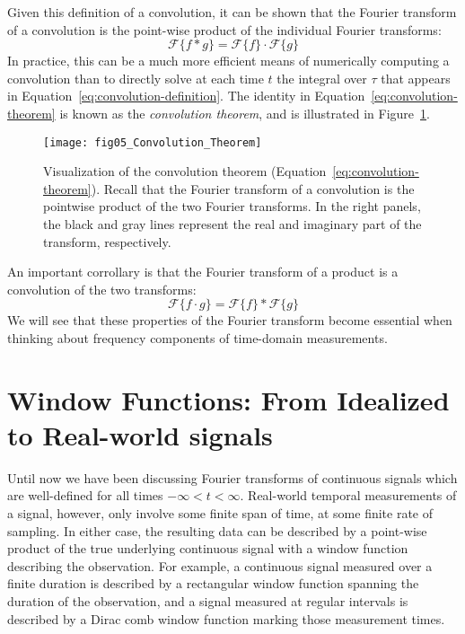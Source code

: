 \documentclass[preprint]{aastex}
\newcommand{\fig}[1]{Figure~\ref{fig:#1}}
\newcommand{\figlabel}[1]{\label{fig:#1}}
\newcommand{\Eq}[1]{Equation~\ref{eq:#1}}
\newcommand{\eq}[1]{\Eq{#1}}
\newcommand{\eqlabel}[1]{\label{eq:#1}}
\newcommand{\sectlabel}[1]{\label{sect:#1}}
\begin{document}
Given this definition of a convolution, it can be shown that the Fourier transform of a convolution is the point-wise product of the individual
Fourier transforms:
\begin{equation}
  \mathcal{F}\{f \ast g\} = \mathcal{F}\{f\} \cdot \mathcal{F}\{g\}
  \eqlabel{convolution-theorem}
\end{equation}
In practice, this can be a much more efficient means of numerically computing a convolution
than to directly solve at each time $t$ the integral over $\tau$ that appears
in \eq{convolution-definition}.
The identity in \eq{convolution-theorem} is known as the
{\it convolution theorem}, and is illustrated in \fig{convolution-theorem}.
\begin{figure}[ht]
  \centering
  \texttt{[image: fig05\_Convolution\_Theorem]}
  \caption{Visualization of the convolution theorem (\eq{convolution-theorem}).
    Recall that the Fourier transform of
    a convolution is the pointwise product of the two Fourier transforms.
    In the right panels, the black and gray lines represent the real and
    imaginary part of the transform, respectively.
    \figlabel{convolution-theorem}}
\end{figure}
An important corrollary is that the Fourier transform of a product is a convolution of the two transforms:
\begin{equation}
  \mathcal{F}\{f \cdot g\} = \mathcal{F}\{f\} \ast \mathcal{F}\{g\}
  \eqlabel{convolution-theorem-inverse}
\end{equation}
We will see that these properties of the Fourier transform become essential
when thinking about frequency components of time-domain measurements.


\section{Window Functions: From Idealized to Real-world signals}
\sectlabel{window-functions}

Until now we have been discussing Fourier transforms of continuous signals
which are well-defined for all times $-\infty < t < \infty$.
Real-world temporal measurements of a signal, however, only involve some
finite span of time, at some finite rate of sampling.
In either case, the resulting data can be described by a point-wise product
of the true underlying continuous signal with a window function describing
the observation.
For example, a continuous signal measured over a finite duration is described
by a rectangular window function spanning the duration of the observation,
and a signal measured at regular intervals is described by a Dirac comb window
function marking those measurement times.
\end{document}
